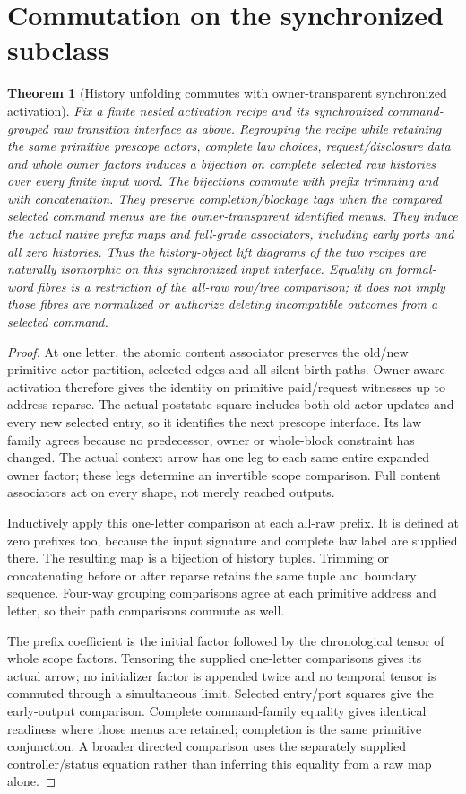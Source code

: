 \documentclass[11pt]{article}
\newtheorem{theorem}{Theorem}\newtheorem{proposition}{Proposition}
\begin{document}
\section{Commutation on the synchronized subclass}
\begin{theorem}[History unfolding commutes with owner-transparent synchronized activation]
Fix a finite nested activation recipe and its synchronized command-grouped raw transition interface as above. Regrouping the recipe while retaining the same primitive prescope actors, complete law choices, request/disclosure data and whole owner factors induces a bijection on complete selected raw histories over every finite input word. The bijections commute with prefix trimming and with concatenation. They preserve completion/blockage tags when the compared selected command menus are the owner-transparent identified menus. They induce the actual native prefix maps and full-grade associators, including early ports and all zero histories. Thus the history-object lift diagrams of the two recipes are naturally isomorphic on this synchronized input interface. Equality on formal-word fibres is a restriction of the all-raw row/tree comparison; it does not imply those fibres are normalized or authorize deleting incompatible outcomes from a selected command.
\end{theorem}
\begin{proof}
At one letter, the atomic content associator preserves the old/new primitive actor partition, selected edges and all silent birth paths. Owner-aware activation therefore gives the identity on primitive paid/request witnesses up to address reparse. The actual poststate square includes both old actor updates and every new selected entry, so it identifies the next prescope interface. Its law family agrees because no predecessor, owner or whole-block constraint has changed. The actual context arrow has one leg to each same entire expanded owner factor; these legs determine an invertible scope comparison. Full content associators act on every shape, not merely reached outputs.

Inductively apply this one-letter comparison at each all-raw prefix. It is defined at zero prefixes too, because the input signature and complete law label are supplied there. The resulting map is a bijection of history tuples. Trimming or concatenating before or after reparse retains the same tuple and boundary sequence. Four-way grouping comparisons agree at each primitive address and letter, so their path comparisons commute as well.

The prefix coefficient is the initial factor followed by the chronological tensor of whole scope factors. Tensoring the supplied one-letter comparisons gives its actual arrow; no initializer factor is appended twice and no temporal tensor is commuted through a simultaneous limit. Selected entry/port squares give the early-output comparison. Complete command-family equality gives identical readiness where those menus are retained; completion is the same primitive conjunction. A broader directed comparison uses the separately supplied controller/status equation rather than inferring this equality from a raw map alone.\end{proof}
\end{document}
